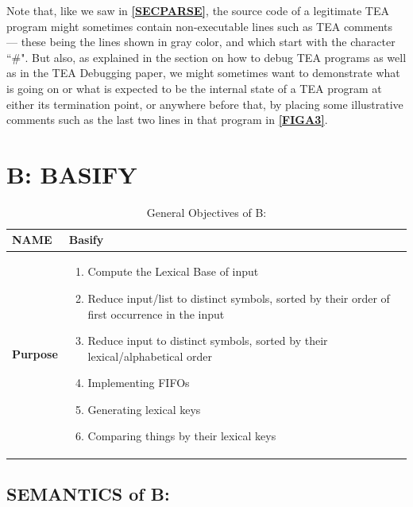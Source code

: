 \documentclass[a4paper, 18pt]{book} %
\begin{document}
Note that, like we saw in \textbf{\autoref{SECPARSE}}, the source code of a legitimate TEA program might sometimes contain non-executable lines such as TEA comments --- these being the lines shown in gray color, and which start with the character ``\#". But also, as explained in the section on how to debug TEA programs as well as in the TEA Debugging paper\cite{Lutalo2025debug}, we might sometimes want to demonstrate what is going on or what is expected to be the internal state of a TEA program at either its termination point, or anywhere before that, by placing some illustrative comments such as the last two lines in that program in \textbf{\autoref{FIGA3}}.




\chapter{B: BASIFY}
\label{SECB}


\begin{table}[H]
  \centering
  \LARGE
	\begin{tabular}[t]{|p{}|p{}}
 
	\textbf{NAME} & Basify\\
	\hline
	\textbf{Purpose} & \begin{enumerate}
	\item Compute the Lexical Base of input
	\item Reduce input/list to distinct symbols, sorted by their order of first occurrence in the input
	\item Reduce input to distinct symbols, sorted by their lexical/alphabetical order
	\item Implementing FIFOs
	\item Generating lexical keys
	\item Comparing things by their lexical keys
	\end{enumerate}\\
	\hline
	              
\end{tabular}
\caption{General Objectives of B:}
  \label{TABTAZB}
\end{table}


\section{SEMANTICS of B:}
\label{SECSEMB}
\end{document}
